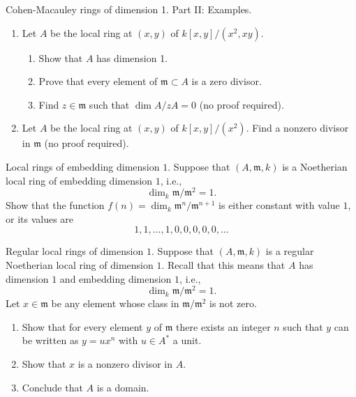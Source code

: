 \begin{exercise}
\label{exercise-CM-dim-1-II}
Cohen-Macauley rings of dimension 1. Part II: Examples.
\begin{enumerate}
\item Let $A$ be the local ring at $(x, y)$ of $k[x, y]/(x^2, xy)$.
\begin{enumerate}
\item Show that $A$ has dimension 1.
\item Prove that every element of ${\mathfrak m}\subset A$ is a
zero divisor.
\item Find $z\in {\mathfrak m}$ such that $\dim A/zA = 0$
(no proof required).
\end{enumerate}
\item Let $A$ be the local ring at $(x, y)$ of $k[x, y]/(x^2)$.
Find a nonzero divisor in ${\mathfrak m}$ (no proof required).
\end{enumerate}
\end{exercise}

\begin{exercise}
\label{exercise-embedding-dim-1}
Local rings of embedding dimension $1$.
Suppose that $(A, {\mathfrak m}, k)$ is a Noetherian local ring
of embedding dimension $1$, i.e.,
$$
\dim_k {\mathfrak m}/{\mathfrak m}^2 = 1.
$$
Show that the function $f(n) = \dim_k {\mathfrak m}^n/{\mathfrak m}^{n + 1}$
is either constant with value $1$, or its values are
$$
1, 1, \ldots, 1, 0, 0, 0, 0, 0, \ldots
$$
\end{exercise}

\begin{exercise}
\label{exercise-regular-local-dim-1}
Regular local rings of dimension $1$.
Suppose that $(A, {\mathfrak m}, k)$ is a regular Noetherian local ring of
dimension $1$. Recall that this means that $A$ has dimension $1$
and embedding dimension $1$, i.e.,
$$
\dim_k {\mathfrak m}/{\mathfrak m}^2 = 1.
$$
Let $x\in{\mathfrak m}$ be any element whose class in ${\mathfrak m}/{\mathfrak
m}^2$ is not zero.
\begin{enumerate}
\item Show that for every element $y$
of ${\mathfrak m}$ there exists an integer $n$ such that $y$ can be written as
$y = ux^n$ with $u\in A^\ast$ a unit.
\item Show that $x$ is a nonzero divisor in $A$.
\item Conclude that $A$ is a domain.
\end{enumerate}
\end{exercise}

